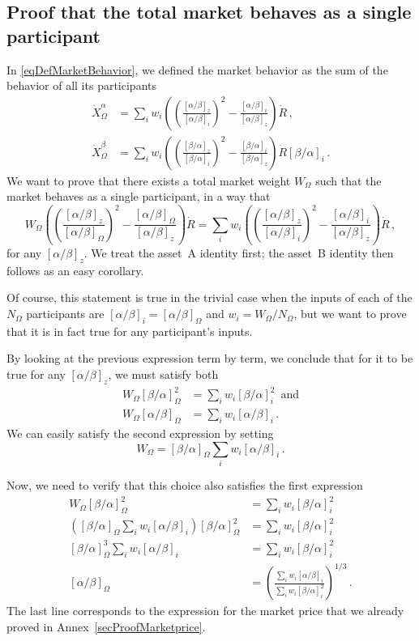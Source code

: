 \documentclass[letterpaper]{article}
\newcommand{\priceAB}{\left[\alpha / \beta\right]}
\newcommand{\priceBA}{\left[\beta / \alpha\right]}
\begin{document}
\subsection{Proof that the total market behaves as a single participant}\label{secProofTotalMarketWeight}

In \eqref{eqDefMarketBehavior}, we defined the market behavior as the sum of the behavior of all its participants
\begin{align*}
    \dot{X}_\Omega^\alpha &= \sum_i w_i \left( \left( \frac{\priceAB_z}{\priceAB_i}\right)^2 - \frac{\priceAB_i}{\priceAB_z} \right) \dot{R} \,,\\
    \dot{X}_\Omega^\beta &= \sum_i w_i \left( \left( \frac{\priceBA_z}{\priceBA_i}\right)^2 - \frac{\priceBA_i}{\priceBA_z} \right) \dot{R} \priceBA_i \,.
\end{align*}
We want to prove that there exists a total market weight $W_\Omega$ such that the market behaves as a single participant, in a way that
\begin{equation*}
    W_\Omega\left(\left(\frac{\priceAB_z}{\priceAB_\Omega}\right)^2-\frac{\priceAB_\Omega}{\priceAB_z}\right) \dot{R} = \sum_i w_i \left( \left( \frac{\priceAB_z}{\priceAB_i}\right)^2 - \frac{\priceAB_i}{\priceAB_z} \right) \dot{R} \,,
\end{equation*}
for any $\priceAB_z$. We treat the asset~A identity first; the asset~B identity then follows as an easy corollary.

Of course, this statement is true in the trivial case when the inputs of each of the $N_\Omega$ participants are $\priceAB_i = \priceAB_\Omega$ and $w_i=W_\Omega / N_\Omega$, but we want to prove that it is in fact true for any participant's inputs.

By looking at the previous expression term by term, we conclude that for it to be true for any $\priceAB_z$, we must satisfy both
\begin{align*}
    W_\Omega \priceBA_\Omega^2 &= \sum_i w_i \priceBA_i^2 \, \text{ and}\\
    W_\Omega \priceAB_\Omega &= \sum_i w_i \priceAB_i\,.
\end{align*}
We can easily satisfy the second expression by setting
\begin{equation*}
    W_\Omega = \priceBA_\Omega \sum_i w_i \priceAB_i\,.
\end{equation*}

Now, we need to verify that this choice also satisfies the first expression
\begin{align*}
    W_\Omega \priceBA_\Omega^2 &= \sum_i w_i \priceBA_i^2 \\
    \left(\priceBA_\Omega \sum_i w_i \priceAB_i\right) \priceBA_\Omega^2 &= \sum_i w_i \priceBA_i^2\\
    \priceBA_\Omega^3 \sum_i w_i \priceAB_i &= \sum_i w_i \priceBA_i^2\\
    \priceAB_\Omega &= \left(\frac{\displaystyle \sum_i w_i \priceAB_i}{\displaystyle \sum_i w_i \priceBA_i^2} \right)^{1/3} \,.
\end{align*}
The last line corresponds to the expression for the market price that we already proved in Annex~\ref{secProofMarketprice}.
\end{document}
